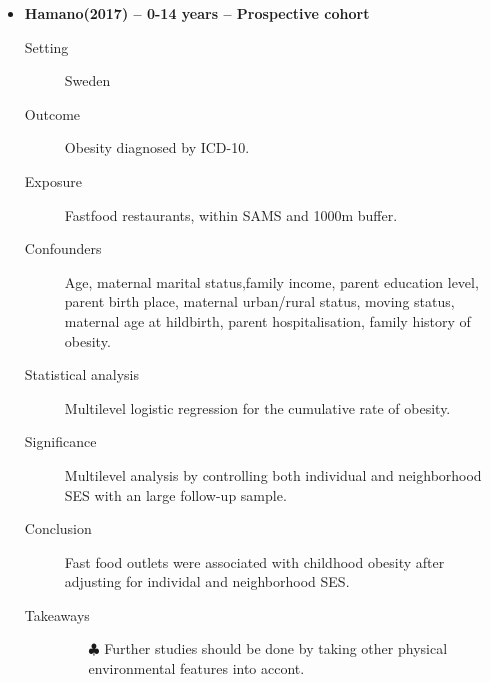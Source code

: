 \documentclass{article}
\begin{document}
\begin{itemize}
\item{\bf Hamano(2017) -- 0-14 years  -- Prospective cohort} 
		\begin{description}
			\item[Setting] Sweden
			\item[Outcome] Obesity diagnosed by ICD-10. 
			\item[Exposure] Fastfood restaurants, within SAMS and 1000m buffer.
			\item[Confounders] Age, maternal marital status,family income, parent education level, parent birth place, maternal urban/rural status, moving status, maternal age at hildbirth, parent hospitalisation, family history of obesity. 
			\item[Statistical analysis] Multilevel logistic regression for the cumulative rate of obesity. 
			\item[Significance] Multilevel analysis by controlling both individual and neighborhood SES with an large follow-up sample.
			\item[Conclusion] Fast food outlets were associated with childhood obesity after adjusting for individal and neighborhood SES.
			\item[Takeaways] \mbox{}\par
				\begin{itemize}
					\item[$\clubsuit$] Further studies should be done by taking other physical environmental features into accont.
				\end{itemize} 
		\end{description}


\end{itemize}
\end{document}
